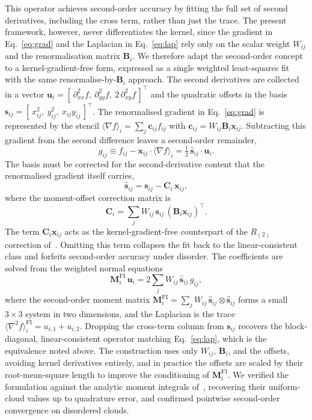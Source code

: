 \documentclass[preprint,review,12pt]{elsarticle}
\newcommand{\xij}{\mathbf{x}_{ij}}
\newcommand{\Bi}{\mathbf{B}_i}
\newcommand{\lap}[1]{\langle\nabla^2 #1\rangle}
\newcommand{\gradop}[1]{\langle\nabla #1\rangle}
\begin{document}
This operator achieves second-order accuracy by fitting the full set of second derivatives, including the cross term, rather than just the trace.
The present framework, however, never differentiates the kernel, since the gradient in Eq.~\eqref{eq:grad} and the Laplacian in Eq.~\eqref{eq:lap} rely only on the scalar weight $W_{ij}$ and the renormalisation matrix $\Bi$.
We therefore adapt the second-order concept to a kernel-gradient-free form, expressed as a single weighted least-squares fit with the same renormalise-by-$\Bi$ approach.
The second derivatives are collected in a vector $\mathbf u_i=[\,\partial^2_{xx}f,\ \partial^2_{yy}f,\ 2\,\partial^2_{xy}f\,]^\top$ and the quadratic offsets in the basis $\mathbf s_{ij}=[\,x_{ij}^2,\ y_{ij}^2,\ x_{ij}y_{ij}\,]^\top$.
The renormalised gradient in Eq.~\eqref{eq:grad} is represented by the stencil $\gradop{f}_i=\sum_j\mathbf c_{ij}f_{ij}$ with $\mathbf c_{ij}=W_{ij}\Bi\xij$.
Subtracting this gradient from the second difference leaves a second-order remainder,
\begin{equation}
  g_{ij}\equiv f_{ij}-\xij\!\cdot\!\gradop{f}_i=\tfrac12\,\hat{\mathbf s}_{ij}\!\cdot\!\mathbf u_i.
  \label{eq:fi-rem}
\end{equation}
The basis must be corrected for the second-derivative content that the renormalised gradient itself carries,
\begin{equation}
  \hat{\mathbf s}_{ij}=\mathbf s_{ij}-\mathbf C_i\,\xij,
  \label{eq:fi-corr}
\end{equation}
where the moment-offset correction matrix is
\begin{equation}
  \mathbf C_i=\sum_j W_{ij}\,\mathbf s_{ij}\,(\Bi\xij)^\top.
  \label{eq:C_i_def}
\end{equation}
The term $\mathbf C_i\xij$ acts as the kernel-gradient-free counterpart of the $R_{(2)}$ correction of~\cite{Asai2023}.
Omitting this term collapses the fit back to the linear-consistent class and forfeits second-order accuracy under disorder.
The coefficients are solved from the weighted normal equations
\begin{equation}
  \mathbf M_i^{\mathrm{FI}}\,\mathbf u_i=2\sum_j W_{ij}\,\hat{\mathbf s}_{ij}\,g_{ij},
  \label{eq:fi-solve}
\end{equation}
where the second-order moment matrix $\mathbf M_i^{\mathrm{FI}}=\sum_j W_{ij}\,\hat{\mathbf s}_{ij}\otimes\hat{\mathbf s}_{ij}$ forms a small $3\times3$ system in two dimensions, and the Laplacian is the trace $\lap{f}_i^{\mathrm{FI}}=u_{i,1}+u_{i,2}$.
Dropping the cross-term column from $\mathbf s_{ij}$ recovers the block-diagonal, linear-consistent operator matching Eq.~\eqref{eq:lap}, which is the equivalence noted above.
The construction uses only $W_{ij}$, $\Bi$, and the offsets, avoiding kernel derivatives entirely, and in practice the offsets are scaled by their root-mean-square length to improve the conditioning of $\mathbf M_i^{\mathrm{FI}}$.
We verified the formulation against the analytic moment integrals of~\cite{Asai2023}, recovering their uniform-cloud values up to quadrature error, and confirmed pointwise second-order convergence on disordered clouds.
\end{document}
